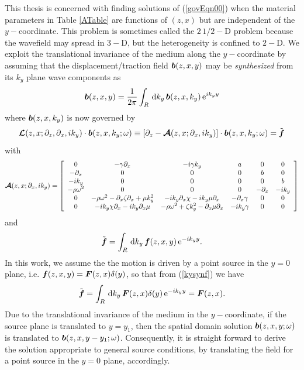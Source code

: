 \documentclass[11pt,a4paper]{article}
\newcommand{\CB}[1]{\mbox{\boldmath$\cal #1$\unboldmath}}
\newcommand{\bmi}[1]{\mbox{\boldmath$\mit #1$\unboldmath}}
\begin{document}
This thesis is concerned with finding solutions of (\ref{govEqn00}) when
the material parameters in Table \ref{ATable} are functions of $(z,x)$ but are
independent of  the $y-$coordinate. This problem is sometimes called the
$2\,{1/2}-$D problem because the wavefield may spread in $3-$D,
but the heterogeneity is confined to $2-$D.
We exploit the translational invariance of the medium along the
$y-$coordinate by assuming that the displacement/traction field ${\bmi
b}(z,x,y)$ may be {\em synthesized\/} from its  $k_y$ plane wave components as
\begin{equation} \label{kysyn}
{\bmi b}(z,x,y)={\frac{1}{2\pi }}\int_{R} \, {\rm d}{k}_{y}\,{\bmi
b}(z,x,{k}_{y})\, {\rm e}^{i{k}_{y}y}
\end{equation}
where ${\bmi b}(z,x,{k}_{y})$ is now governed by
\begin{equation} \label{govEqn0}
{\CB L}(z,x;{\partial }_{z},{\partial }_{x},i {k}_{y})\cdot {\bmi  b
}(z,x,k_y; \omega)\equiv
\left[\partial_{z}-{\CB A}(z,x;{\partial }_{x},i {k}_{y})\right]\cdot {\bmi  b }(z,x,k_y;
\omega)=
\tilde{\bmi  f}
\end{equation}
with
\begin{equation} \label{Adef}
{\CB A}(z,x;{\partial }_{x},i {k}_{y})=\left[{\begin{array}{cccccc}
0&- \gamma {\partial }_{  x}&  -i \gamma {  k}_{  y}&  a&0&0\\ -{ \partial
}_{x}&0&0&0&b&0\\ -i{k}_{y}&0&0&0&0&b\\ - \rho {\omega }^{
2}&  0&0&0&-{ \partial }_{x}&-i{k}_{y}\\ 0&- \rho {\omega
}^{  2}  -{ \partial }_{x} \zeta {\partial }_{
x}  + \mu {  k}_{  y}^{  2}&
-i{k}_{y}{ \partial }_{x} \chi   -i{k}_{y} \mu {\partial
}_{  x}&  -{ \partial }_{x} \gamma &  0&0\\
0&-i{k}_{y} \chi {\partial }_{  x}  -i{k}_{y}{ \partial
}_{x} \mu &  - \rho {\omega }^{  2}  + \zeta
{  k}_{  y}^{  2}  -{ \partial }_{x} \mu
{\partial }_{  x}&  -i{k}_{y} \gamma &  0&0\end{array}}\right]
\end{equation}
and
\begin{equation} \label{kysynf}
\tilde{\bmi f}=\int_{R} \, {\rm d}{k}_{y}\,{\bmi f}(z,x,y)
\, {\rm e}^{-i{k}_{y}y}.
\end{equation}
In this work, we assume the the motion is driven by a point source in the
$y=0$ plane, i.e. ${\bmi f}(z,x,y)= {\bmi F}(z,x) \delta(y)$, so that
from (\ref{kysynf}) we have
\begin{equation} \label{kysynf1}
\tilde{\bmi f}=\int_{R} \, {\rm d}{k}_{y}\,{\bmi F}(z,x) \delta(y)
\, {\rm e}^{-i{k}_{y}y} = {\bmi F}(z,x).
\end{equation}
Due to the translational invariance of the medium in the $y-$coordinate,
if the source plane is translated to  $y=y_1$, then the spatial domain solution
${\bmi  b }(z,x,y; \omega)$ is translated to  ${\bmi  b }(z,x,y-y_1;
\omega)$. Consequently, it is straight forward to derive the solution
appropriate to general source conditions, by translating the field
for a point source in the $y=0$ plane, accordingly.
\end{document}
